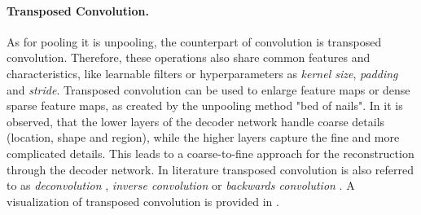 \paragraph{Transposed Convolution.}
As for pooling it is unpooling, the counterpart of convolution is transposed convolution.
Therefore, these operations also share common features and characteristics, like learnable filters or hyperparameters as \textit{kernel size}, \textit{padding} and \textit{stride}.
Transposed convolution can be used to enlarge feature maps or dense sparse feature maps, as created by the unpooling method "bed of nails".
In \cite{NHH15-DeConvNet} it is observed, that the lower layers of the decoder network handle coarse details (\eg location, shape and region), while the higher layers capture the fine and more complicated details.
This leads to a coarse-to-fine approach for the reconstruction through the decoder network.
In literature transposed convolution is also referred to as  \textit{deconvolution} \cite{NHH15-DeConvNet}, \textit{inverse convolution} \cite{Bad17-SegNet} or \textit{backwards convolution} \cite{LSD15-FCN}.
A visualization of transposed convolution is provided in \cite{DV19-ConvolutionGuide}.

